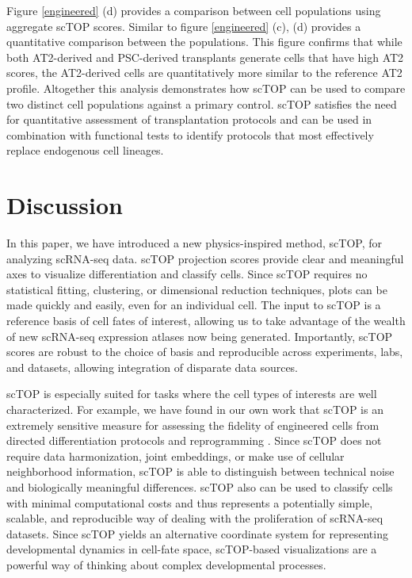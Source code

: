 \documentclass[aps,superscriptaddress, notitlepage,longbibliography]{revtex4-1}
\begin{document}
Figure \ref{engineered} (d) provides a comparison between cell populations using aggregate scTOP scores. Similar to figure \ref{engineered} (c), (d) provides a quantitative comparison between the populations. This figure confirms that while both AT2-derived and PSC-derived transplants generate cells that have high AT2 scores, the AT2-derived cells are quantitatively more similar to the reference AT2 profile. Altogether this analysis demonstrates how scTOP can be used to compare two distinct cell populations against a primary control. scTOP satisfies the need for quantitative assessment of transplantation protocols and can be used in combination with functional tests to identify protocols that most effectively replace endogenous cell lineages. 



\section{Discussion}

In this paper, we have introduced a new physics-inspired method, scTOP, for analyzing scRNA-seq data. scTOP projection scores provide clear and meaningful axes to visualize differentiation and classify cells. Since scTOP requires no statistical fitting, clustering, or dimensional reduction techniques, plots can be made quickly and easily, even for an individual cell. The input to scTOP is a reference basis of cell fates of interest, allowing us to take advantage of the wealth of new scRNA-seq expression atlases now being generated. Importantly, scTOP scores are robust to the choice of basis and reproducible across experiments, labs, and datasets, allowing integration of disparate data sources.

scTOP is especially suited for tasks where the cell types of interests are well characterized. For example, we have found in our own work that scTOP is an extremely sensitive measure for assessing the fidelity of engineered cells from directed differentiation protocols and reprogramming \cite{herriges_durable_2022}. Since scTOP does not require data harmonization, joint embeddings, or make use of cellular neighborhood information,  scTOP is able to distinguish between technical noise and biologically meaningful differences. scTOP also can be used to classify cells with minimal computational costs and thus represents a potentially simple, scalable, and reproducible way of dealing with the proliferation of scRNA-seq datasets. Since scTOP yields an alternative coordinate system for representing developmental dynamics in cell-fate space, scTOP-based visualizations are a powerful way of thinking about complex developmental processes.
\end{document}
